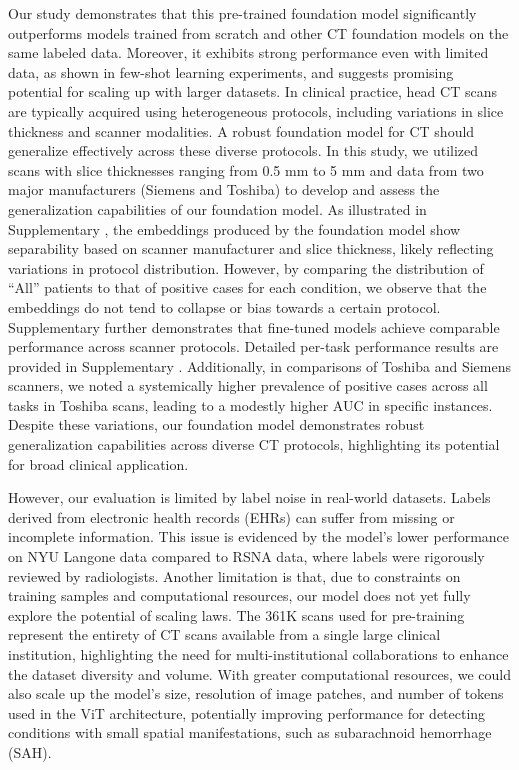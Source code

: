 \documentclass[fleqn,10pt]{wlscirep}
\begin{document}
Our study demonstrates that this pre-trained foundation model significantly outperforms models trained from scratch and other CT foundation models on the same labeled data. Moreover, it exhibits strong performance even with limited data, as shown in few-shot learning experiments, and suggests promising potential for scaling up with larger datasets. In clinical practice, head CT scans are typically acquired using heterogeneous protocols, including variations in slice thickness and scanner modalities. A robust foundation model for CT should generalize effectively across these diverse protocols. In this study, we utilized scans with slice thicknesses ranging from 0.5 mm to 5 mm and data from two major manufacturers (Siemens and Toshiba) to develop and assess the generalization capabilities of our foundation model. As illustrated in Supplementary , the embeddings produced by the foundation model show separability based on scanner manufacturer and slice thickness, likely reflecting variations in protocol distribution. However, by comparing the distribution of “All” patients to that of positive cases for each condition, we observe that the embeddings do not tend to collapse or bias towards a certain protocol. Supplementary  further demonstrates that fine-tuned models achieve comparable performance across scanner protocols. Detailed per-task performance results are provided in Supplementary .  Additionally, in comparisons of Toshiba and Siemens scanners, we noted a systemically higher prevalence of positive cases across all tasks in Toshiba scans, leading to a modestly higher AUC in specific instances. Despite these variations, our foundation model demonstrates robust generalization capabilities across diverse CT protocols, highlighting its potential for broad clinical application.

However, our evaluation is limited by label noise in real-world datasets. Labels derived from electronic health records (EHRs) can suffer from missing or incomplete information. This issue is evidenced by the model’s lower performance on NYU Langone data compared to RSNA data, where labels were rigorously reviewed by radiologists. Another limitation is that, due to constraints on training samples and computational resources, our model does not yet fully explore the potential of scaling laws. The 361K scans used for pre-training represent the entirety of CT scans available from a single large clinical institution, highlighting the need for multi-institutional collaborations to enhance the dataset diversity and volume. With greater computational resources, we could also scale up the model’s size, resolution of image patches, and number of tokens used in the ViT architecture, potentially improving performance for detecting conditions with small spatial manifestations, such as subarachnoid hemorrhage (SAH).
\end{document}
